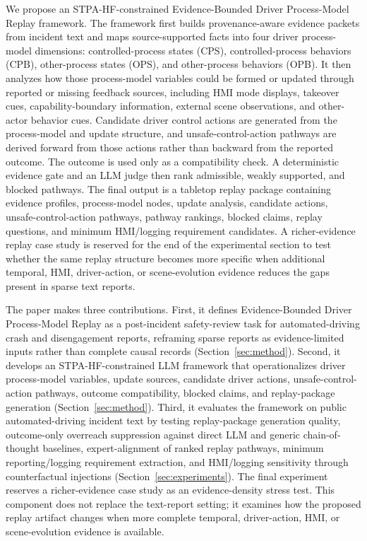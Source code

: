 We propose an STPA-HF-constrained Evidence-Bounded Driver Process-Model Replay framework. The framework first builds provenance-aware evidence packets from incident text and maps source-supported facts into four driver process-model dimensions: controlled-process states (CPS), controlled-process behaviors (CPB), other-process states (OPS), and other-process behaviors (OPB). It then analyzes how those process-model variables could be formed or updated through reported or missing feedback sources, including HMI mode displays, takeover cues, capability-boundary information, external scene observations, and other-actor behavior cues. Candidate driver control actions are generated from the process-model and update structure, and unsafe-control-action pathways are derived forward from those actions rather than backward from the reported outcome. The outcome is used only as a compatibility check. A deterministic evidence gate and an LLM judge then rank admissible, weakly supported, and blocked pathways. The final output is a tabletop replay package containing evidence profiles, process-model nodes, update analysis, candidate actions, unsafe-control-action pathways, pathway rankings, blocked claims, replay questions, and minimum HMI/logging requirement candidates. A richer-evidence replay case study is reserved for the end of the experimental section to test whether the same replay structure becomes more specific when additional temporal, HMI, driver-action, or scene-evolution evidence reduces the gaps present in sparse text reports.

The paper makes three contributions. First, it defines Evidence-Bounded Driver Process-Model Replay as a post-incident safety-review task for automated-driving crash and disengagement reports, reframing sparse reports as evidence-limited inputs rather than complete causal records (Section~\ref{sec:method}). Second, it develops an STPA-HF-constrained LLM framework that operationalizes driver process-model variables, update sources, candidate driver actions, unsafe-control-action pathways, outcome compatibility, blocked claims, and replay-package generation (Section~\ref{sec:method}). Third, it evaluates the framework on public automated-driving incident text by testing replay-package generation quality, outcome-only overreach suppression against direct LLM and generic chain-of-thought baselines, expert-alignment of ranked replay pathways, minimum reporting/logging requirement extraction, and HMI/logging sensitivity through counterfactual injections (Section~\ref{sec:experiments}). The final experiment reserves a richer-evidence case study as an evidence-density stress test. This component does not replace the text-report setting; it examines how the proposed replay artifact changes when more complete temporal, driver-action, HMI, or scene-evolution evidence is available.
